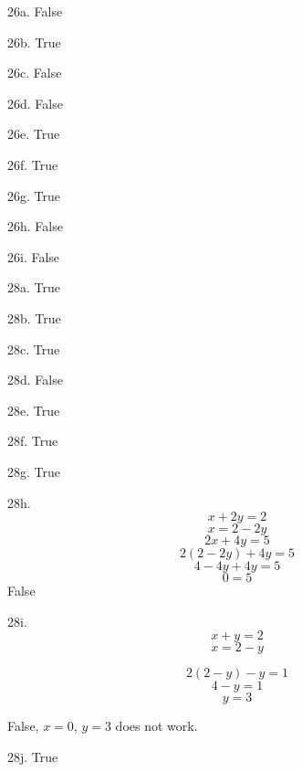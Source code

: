 \documentclass{article}
\begin{document}
26a. False

26b. True

26c. False

26d. False

26e. True

26f. True

26g. True 

26h. False

26i. False

28a. True

28b. True

28c. True

28d. False

28e. True

28f. True

28g. True

28h. 
$$x + 2y = 2$$
$$x = 2 - 2y$$
$$2x + 4y = 5$$
$$2(2-2y) + 4y = 5$$
$$4 - 4y + 4y  = 5$$
$$0 = 5$$
False

28i.
$$x+y = 2$$
$$x = 2 - y$$

$$2(2-y) - y = 1$$
$$4 - y = 1$$
$$y = 3$$

False, $x=0$, $y=3$ does not work.

28j.
True
\end{document}
